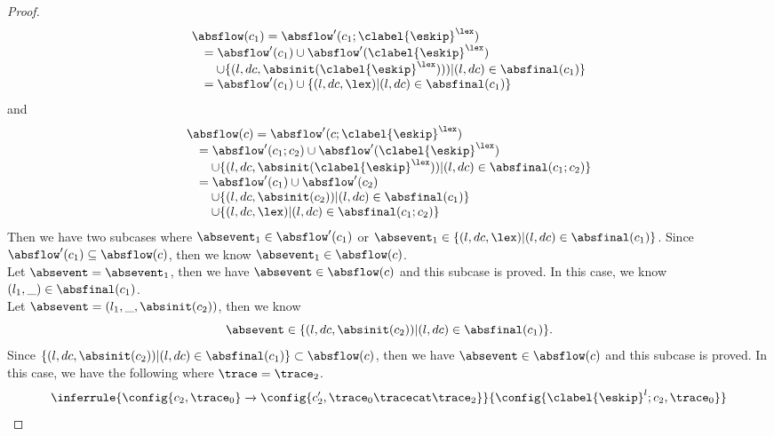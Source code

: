 \begin{proof}
  \[
    \begin{array}{l}
      \absflow(c_1) = \absflow'(c_1; \clabel{\eskip}^{\lex}) 
      \\ \quad
      = \absflow'(c_1) \cup \absflow'(\clabel{\eskip}^{\lex}) 
      \\ \qquad
      \cup \{ (l, dc, \absinit(\clabel{\eskip}^{\lex}))) | (l, dc) \in \absfinal(c_1) \} 
      \\ \quad
      = \absflow'(c_1) \cup  \{ (l, dc, \lex) | (l, dc) \in \absfinal(c_1) \} 
   \end{array}
  \]  
  and 
  \[
    \begin{array}{l}
      \absflow(c) = \absflow'(c; \clabel{\eskip}^{\lex}) 
      \\ \quad
      = \absflow'(c_1;c_2) \cup \absflow'(\clabel{\eskip}^{\lex}) 
      \\ \qquad  
      \cup \{ (l, dc, \absinit(\clabel{\eskip}^{\lex})) | (l, dc) \in \absfinal(c_1; c_2) \} 
      \\ \quad  
      = \absflow'(c_1) \cup \absflow'(c_2) 
      \\ \quad \quad
      \cup \{ (l, dc, \absinit(c_2)) | (l, dc) \in \absfinal(c_1) \} 
      \\ \quad \quad
      \cup \{ (l, dc, \lex) | (l, dc) \in \absfinal(c_1; c_2) \} 
   \end{array}
  \]
  Then we have two subcases where 
  $\absevent_1 \in \absflow'(c_1)$ or $\absevent_1 \in \{ (l, dc, \lex) | (l, dc) \in \absfinal(c_1) \}$.
  Since $\absflow'(c_1) \subseteq \absflow(c)$, then we know $\absevent_1 \in \absflow(c)$.
  \\
  Let $\absevent = \absevent_1$, then we have $\absevent \in \absflow(c)$ and this subcase is proved.
  In this case, we know $(l_1, \_) \in \absfinal(c_1)$.
  \\
  Let $\absevent = (l_1, \_, \absinit(c_2))$, then we know 
  \[
    \absevent \in   \{ (l, dc, \absinit(c_2)) | (l, dc) \in \absfinal(c_1) \}. 
  \]
  Since $\{ (l, dc, \absinit(c_2)) | (l, dc) \in \absfinal(c_1) \}  \subset\absflow(c)$,  then we have $\absevent \in \absflow(c)$ and this subcase is proved.
  In this case, we have the following where $\trace = \trace_2$.
  \[
    \inferrule
    {
    \config{{c_2, \trace_0}}
    \xrightarrow{}
    \config{{c_2',  \trace_0 \tracecat \trace_2}}
    }
    {
    \config{{\clabel{\eskip}^l; c_2, \trace_0}} 
}\]
\end{proof}
